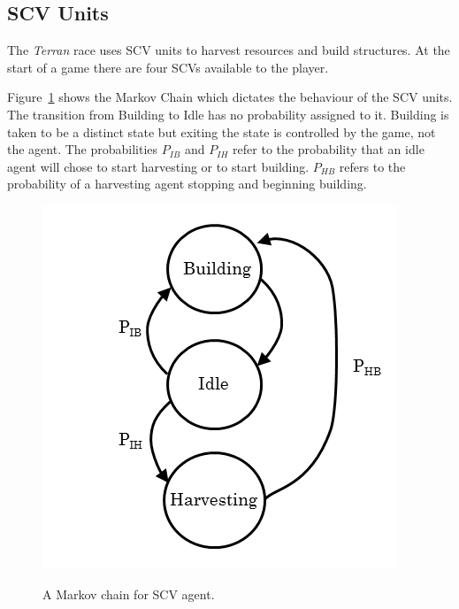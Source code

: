 \subsection{SCV Units}

The \textit{Terran} race uses SCV units to harvest resources and build structures. At the start of a game there are four SCVs available to the player.

Figure~\ref{fig:scv_diagram} shows the Markov Chain which dictates the behaviour of the SCV units. The transition from Building to Idle has no probability assigned to it. Building is taken to be a distinct state but exiting the state is controlled by the game, not the agent. The probabilities \(P_{IB}\) and \(P_{IH}\) refer to the probability that an idle agent will chose to start harvesting or to start building. \(P_{HB}\) refers to the probability of a harvesting agent stopping and beginning building.

\begin{figure}[ht]
\centering
\includegraphics[scale=0.8, trim = 0cm 0cm 0cm 0cm]{diagrams/scv}
\label{fig:scv_diagram}
\caption{A Markov chain for SCV agent.}
\end{figure}